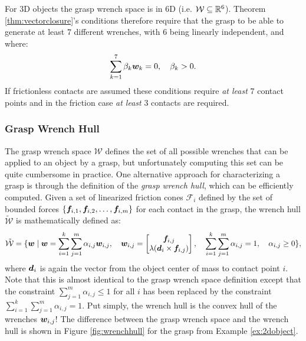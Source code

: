 \begin{example}[3D Object]
For 3D objects the grasp wrench space is in 6D (i.e. $\mathcal{W} \subseteq \mathbb{R}^6$). Theorem \ref{thm:vectorclosure}'s conditions therefore require that the grasp to be able to generate at least $7$ different wrenches, with $6$ being linearly independent, and where:
\begin{equation*}
  \sum_{k=1}^7 \beta_k \bm{w}_k = 0, \quad \beta_k > 0.
\end{equation*}
If frictionless contacts are assumed these conditions require \textit{at least} $7$ contact points and in the friction case \textit{at least} $3$ contacts are required.
\end{example}

\subsubsection{Grasp Wrench Hull}
The grasp wrench space $\mathcal{W}$ defines the set of all possible wrenches that can be applied to an object by a grasp, but unfortunately computing this set can be quite cumbersome in practice. One alternative approach for characterizing a grasp is through the definition of the \textit{grasp wrench hull}, which can be efficiently computed. Given a set of linearized friction cones $\mathcal{F}_i$ defined by the set of bounded forces $\{\bm{f}_{i,1}, \bm{f}_{i,2}, \dots, \bm{f}_{i,m}\}$ for each contact in the grasp, the wrench hull $\tilde{\mathcal{W}}$ is mathematically defined as:
\begin{equation*}
\begin{split}
\tilde{\mathcal{W}} = \{\bm{w} \mid \bm{w} = \sum_{i=1}^k \sum_{j=1}^m \alpha_{i,j}\bm{w}_{i,j}, \quad \bm{w}_{i,j} = \begin{bmatrix}
    \bm{f}_{i,j} \\ \lambda(\bm{d}_i \times \bm{f}_{i,j})
    \end{bmatrix}, \quad \sum_{i=1}^k\sum_{j=1}^m \alpha_{i,j} = 1, \quad \alpha_{i,j} \geq 0\},
\end{split}
\end{equation*}
where $\bm{d}_i$ is again the vector from the object center of mass to contact point $i$. Note that this is almost identical to the grasp wrench space definition except that the constraint $\sum_{j=1}^m \alpha_{i,j} \leq 1$ for all $i$ has been replaced by the constraint $\sum_{i=1}^k\sum_{j=1}^m \alpha_{i,j} = 1$. Put simply, the wrench hull is the convex hull of the wrenches $\bm{w}_{i,j}$! The difference between the grasp wrench space and the wrench hull is shown in Figure \ref{fig:wrenchhull} for the grasp from Example \ref{ex:2dobject}.

